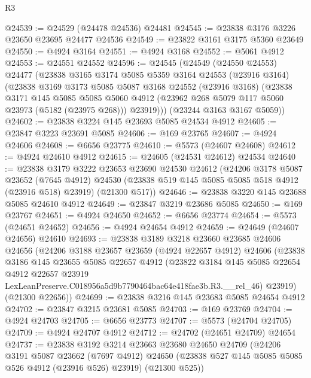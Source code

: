 \begin{lexlean}{R3}
\begin{coremodule}
@24539 := @24529 (@24478 @24536) @24481
@24545 := @23838 @3176 @3226 @23650 @23695 @24477 @24536
@24549 := @23822 @3161 @3175 @5360 @23649
@24550 := @4924 @3164
@24551 := @4924 @3168
@24552 := @5061 @4912
@24553 := @24551 @24552
@24596 := @24545
    (@24549
      (@24550 @24553)
      @24477
      (@23838
        @3165
        @3174
        @5085
        @5359
        @3164
        @24553
        (@23916 @3164)
        (@23838
          @3169
          @3173
          @5085
          @5087
          @3168
          @24552
          (@23916 @3168)
          (@23838
            @3171
            @145
            @5085
            @5085
            @5060
            @4912
            (@23962 @268 @5079 @117 @5060 @23973 (@5182 (@23975 @268)))
            @23919)))
      (@23244 @3163 @3167 @5059))
@24602 := @23838 @3224 @145 @23693 @5085 @24534 @4912
@24605 := @23847 @3223 @23691 @5085
@24606 := @169 @23765
@24607 := @4924 @24606
@24608 := @6656 @23775
@24610 := @5573 (@24607 @24608)
@24612 := @4924 @24610 @4912
@24615 := @24605 (@24531 @24612) @24534
@24640 := @23838
    @3179
    @3222
    @23653
    @23690
    @24530
    @24612
    (@24206
      @3178
      @5087
      @23652
      (@7645 @4912)
      @24530
      (@23838 @519 @145 @5085 @5085 @518 @4912 (@23916 @518) @23919)
      (@21300 @517))
@24646 := @23838 @3220 @145 @23688 @5085 @24610 @4912
@24649 := @23847 @3219 @23686 @5085
@24650 := @169 @23767
@24651 := @4924 @24650
@24652 := @6656 @23774
@24654 := @5573 (@24651 @24652)
@24656 := @4924 @24654 @4912
@24659 := @24649 (@24607 @24656) @24610
@24693 := @23838
    @3189
    @3218
    @23660
    @23685
    @24606
    @24656
    (@24206
      @3188
      @23657
      @23659
      (@4924 @22657 @4912)
      @24606
      (@23838
        @3186
        @145
        @23655
        @5085
        @22657
        @4912
        (@23822
          @3184
          @145
          @5085
          @22654
          @4912
          @22657
          @23919
          LexLeanPreserve.C018956a5d9b7790464bac64e418fae3b.R3.__rel_46)
        @23919)
      (@21300 @22656))
@24699 := @23838 @3216 @145 @23683 @5085 @24654 @4912
@24702 := @23847 @3215 @23681 @5085
@24703 := @169 @23769
@24704 := @4924 @24703
@24705 := @6656 @23773
@24707 := @5573 (@24704 @24705)
@24709 := @4924 @24707 @4912
@24712 := @24702 (@24651 @24709) @24654
@24737 := @23838
    @3192
    @3214
    @23663
    @23680
    @24650
    @24709
    (@24206
      @3191
      @5087
      @23662
      (@7697 @4912)
      @24650
      (@23838 @527 @145 @5085 @5085 @526 @4912 (@23916 @526) @23919)
      (@21300 @525))

\end{coremodule}
\end{lexlean}
